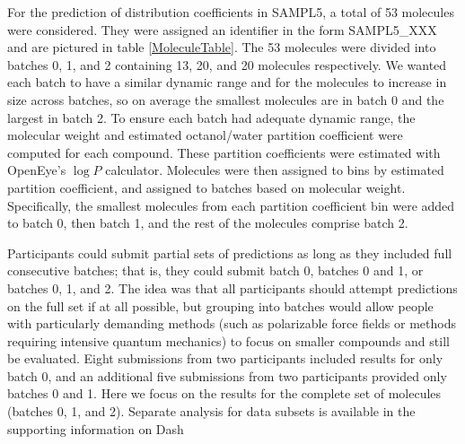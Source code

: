 For the prediction of distribution coefficients in SAMPL5, a total of 53 molecules were considered. 
They were assigned an identifier in the form SAMPL5\_XXX and are pictured in table \ref{MoleculeTable}.  
The 53 molecules were divided into batches 0, 1, and 2 containing 13, 20, and 20 molecules respectively. 
We wanted each batch to have a similar dynamic range and for the molecules to increase in size across batches, so on average the smallest molecules are in batch 0 and the largest in batch 2. 
To ensure each batch had adequate dynamic range, the molecular weight and estimated octanol/water partition coefficient were computed for each compound. 
These partition coefficients were estimated with OpenEye's $\log P$ calculator. Molecules were then assigned to bins by estimated partition coefficient, and assigned to batches based on molecular weight. 
Specifically, the smallest molecules from each partition coefficient bin were added to batch 0, then batch 1, and the rest of the molecules comprise batch 2.

Participants could submit partial sets of predictions as long as they included full consecutive batches; that is, they could submit batch 0, batches 0 and 1, or batches 0, 1, and 2. 
The idea was that all participants should attempt predictions on the full set if at all possible, but grouping into batches would allow people with particularly demanding methods (such as polarizable force fields or methods requiring intensive quantum mechanics) to focus on smaller compounds and still be evaluated. 
Eight submissions from two participants included results for only batch 0, and an additional five submissions from two participants provided only batches 0 and 1.
Here we focus on the results for the complete set of molecules (batches 0, 1, and 2). 
Separate analysis for data subsets is available in the supporting information on Dash

